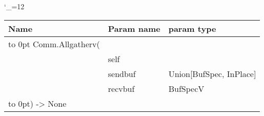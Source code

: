 \begingroup \catcode`\_=12 \tt
\begin{tabular}{lll}
\toprule
\textrm{Name}&\textrm{Param name}&\textrm{param type}\\
\midrule
\hbox to 0pt {Comm.Allgatherv(\hss}\\
& self\\
& sendbuf & Union[BufSpec, InPlace]\\
& recvbuf & BufSpecV\\
\hbox to 0pt{) -> None\hss}\\
\bottomrule
\end{tabular}
\endgroup
